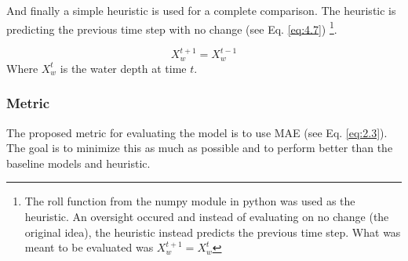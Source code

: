 And finally a simple heuristic is used for a complete comparison. The heuristic is predicting the previous time step with no change (see Eq. \ref{eq:4.7}) \footnote{The roll function from the numpy module in python was used as the heuristic. An oversight occured and instead of evaluating on no change (the original idea), the heuristic instead predicts the previous time step. What was meant to be evaluated was $X_{w}^{t+1} = X_{w}^{t}$}.

\begin{equation}
	\label{eq:4.7}
	X_{w}^{t+1} =  X_{w}^{t-1}
\end{equation}
Where $X_{w}^{t}$ is the water depth at time $t$.

\subsubsection*{Metric}
The proposed metric for evaluating the model is to use MAE (see Eq. \ref{eq:2.3}). The goal is to minimize this as much as possible and to perform better than the baseline models and heuristic.